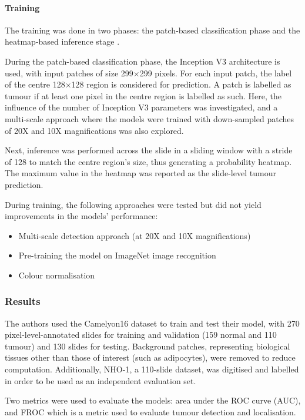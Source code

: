 \documentclass{article}
\begin{document}
\paragraph{Training}
The training was done in two phases: the patch-based classification phase and the heatmap-based inference stage \cite{2016arXiv160605718W}.

During the patch-based classification phase, the Inception V3 architecture is used, with input patches of size 299$\times$299 pixels. For each input patch, the label of the centre 128$\times$128 region is considered for prediction. A patch is labelled as tumour if at least one pixel in the centre region is labelled as such. Here, the influence of the number of Inception V3 parameters was investigated, and a multi-scale approach where the models were trained with down-sampled patches of 20X and 10X magnifications was also explored.

Next, inference was performed across the slide in a sliding window with a stride of 128 to match the centre region’s size, thus generating a probability heatmap. The maximum value in the heatmap was reported as the slide-level tumour prediction.

During training, the following approaches were tested but did not yield improvements in the models’ performance:

\begin{itemize}
	\item Multi-scale detection approach (at 20X and 10X magnifications)
	\item Pre-training the model on ImageNet image recognition
	\item Colour normalisation
\end{itemize}

\subsubsection{Results}
The authors used the Camelyon16 dataset to train and test their model, with 270 pixel-level-annotated slides for training and validation (159 normal and 110 tumour) and 130 slides for testing. Background patches, representing biological tissues other than those of interest (such as adipocytes), were removed to reduce computation. Additionally, NHO-1, a 110-slide dataset, was digitised and labelled in order to be used as an independent evaluation set.

Two metrics were used to evaluate the models: area under the ROC curve (AUC), and FROC which is a metric used to evaluate tumour detection and localisation.
\end{document}
